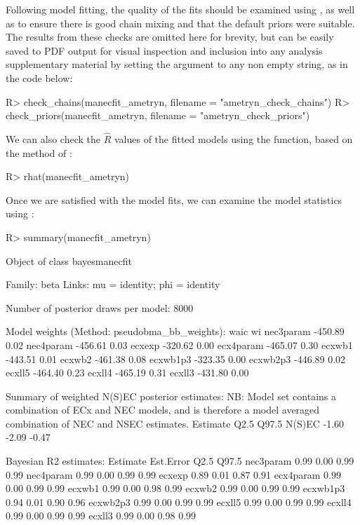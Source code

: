 \documentclass[
  shortnames]{jss}
\begin{document}
Following model fitting, the quality of the fits should be examined using , as well as  to ensure there is good chain mixing and that the default priors were suitable. The results from these checks are omitted here for brevity, but can be easily saved to PDF output for visual inspection and inclusion into any analysis supplementary material by setting the argument  to any non empty string, as in the code below:

\begin{CodeChunk}
\begin{CodeInput}
R> check_chains(manecfit_ametryn, filename = "ametryn_check_chains")
R> check_priors(manecfit_ametryn, filename = "ametryn_check_priors")
\end{CodeInput}
\end{CodeChunk}

We can also check the \(\widehat{R}\) values of the fitted models using the  function, based on the method of \citet{vehtari2021rank}:

\begin{CodeChunk}
\begin{CodeInput}
R> rhat(manecfit_ametryn)
\end{CodeInput}
\end{CodeChunk}

Once we are satisfied with the model fits, we can examine the model statistics using :

\begin{CodeChunk}
\begin{CodeInput}
R> summary(manecfit_ametryn)
\end{CodeInput}
\begin{CodeOutput}
Object of class bayesmanecfit

 Family: beta  
  Links: mu = identity; phi = identity  

Number of posterior draws per model:  8000

Model weights (Method: pseudobma_bb_weights):
             waic   wi
nec3param -450.89 0.02
nec4param -456.61 0.03
ecxexp    -320.62 0.00
ecx4param -465.07 0.30
ecxwb1    -443.51 0.01
ecxwb2    -461.38 0.08
ecxwb1p3  -323.35 0.00
ecxwb2p3  -446.89 0.02
ecxll5    -464.40 0.23
ecxll4    -465.19 0.31
ecxll3    -431.80 0.00


Summary of weighted N(S)EC posterior estimates:
NB: Model set contains a combination of ECx and NEC
    models, and is therefore a model averaged
    combination of NEC and NSEC estimates.
       Estimate  Q2.5 Q97.5
N(S)EC    -1.60 -2.09 -0.47


Bayesian R2 estimates:
          Estimate Est.Error Q2.5 Q97.5
nec3param     0.99      0.00 0.99  0.99
nec4param     0.99      0.00 0.99  0.99
ecxexp        0.89      0.01 0.87  0.91
ecx4param     0.99      0.00 0.99  0.99
ecxwb1        0.99      0.00 0.98  0.99
ecxwb2        0.99      0.00 0.99  0.99
ecxwb1p3      0.94      0.01 0.90  0.96
ecxwb2p3      0.99      0.00 0.99  0.99
ecxll5        0.99      0.00 0.99  0.99
ecxll4        0.99      0.00 0.99  0.99
ecxll3        0.99      0.00 0.98  0.99
\end{CodeOutput}
\end{CodeChunk}
\end{document}
